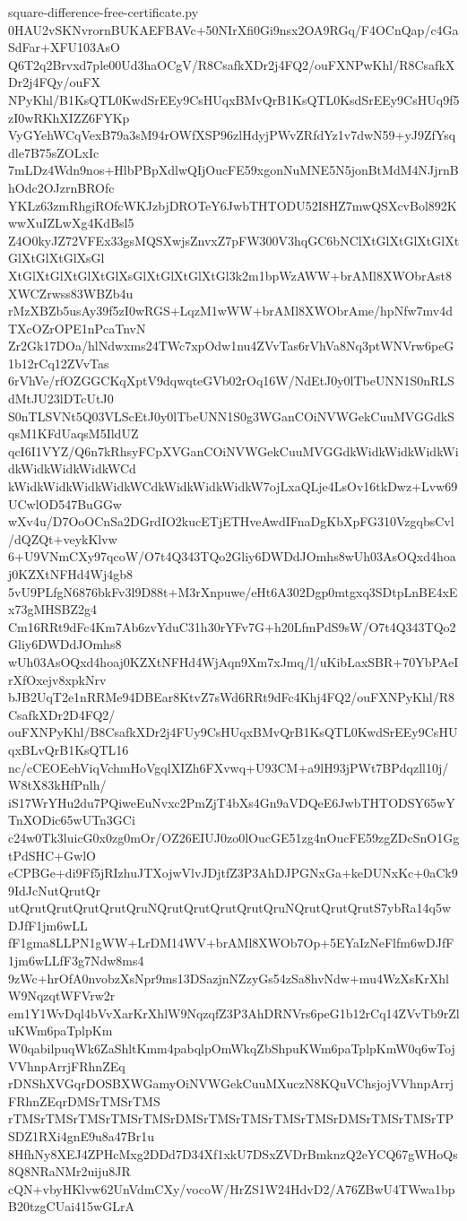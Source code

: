 \documentclass[11pt]{article}
\theoremstyle{definition}
\theoremstyle{remark}
\begin{document}
\begin{filecontents*}[overwrite]{square-difference-free-certificate.py}
0HAU2vSKNvrornBUKAEFBAVc+50NIrXfi0Gi9nsx2OA9RGq/F4OCnQap/c4GaSdFar+XFU103AsO
Q6T2q2Brvxd7ple00Ud3haOCgV/R8CsafkXDr2j4FQ2/ouFXNPwKhl/R8CsafkXDr2j4FQy/ouFX
NPyKhl/B1KsQTL0KwdSrEEy9CsHUqxBMvQrB1KsQTL0KsdSrEEy9CsHUq9f5zI0wRKhXIZZ6FYKp
VyGYehWCqVexB79a3sM94rOWfXSP96zlHdyjPWvZRfdYz1v7dwN59+yJ9ZfYsqdle7B75sZOLxIc
7mLDz4Wdn9nos+HlbPBpXdlwQIjOucFE59xgonNuMNE5N5jonBtMdM4NJjrnBhOdc2OJzrnBROfc
YKLz63zmRhgiROfcWKJzbjDROTeY6JwbTHTODU52I8HZ7mwQSXcvBol892KwwXuIZLwXg4KdBsl5
Z4O0kyJZ72VFEx33gsMQSXwjsZnvxZ7pFW300V3hqGC6bNClXtGlXtGlXtGlXtGlXtGlXtGlXsGl
XtGlXtGlXtGlXtGlXsGlXtGlXtGlXtGl3k2m1bpWzAWW+brAMl8XWObrAst8XWCZrwss83WBZb4u
rMzXBZb5usAy39f5zI0wRGS+LqzM1wWW+brAMl8XWObrAme/hpNfw7mv4dTXcOZrOPE1nPcaTnvN
Zr2Gk17DOa/hlNdwxms24TWc7xpOdw1nu4ZVvTas6rVhVa8Nq3ptWNVrw6peG1b12rCq12ZVvTas
6rVhVe/rfOZGGCKqXptV9dqwqteGVb02rOq16W/NdEtJ0y0lTbeUNN1S0nRLSdMtJU23lDTcUtJ0
S0nTLSVNt5Q03VLScEtJ0y0lTbeUNN1S0g3WGanCOiNVWGekCuuMVGGdkSqsM1KFdUaqsM5IldUZ
qcI6I1VYZ/Q6n7kRhsyFCpXVGanCOiNVWGekCuuMVGGdkWidkWidkWidkWidkWidkWidkWidkWCd
kWidkWidkWidkWidkWCdkWidkWidkWidkW7ojLxaQLje4LsOv16tkDwz+Lvw69UCwlOD547BuGGw
wXv4u/D7OoOCnSa2DGrdIO2kucETjETHveAwdIFnaDgKbXpFG310VzgqbsCvl/dQZQt+veykKlvw
6+U9VNmCXy97qcoW/O7t4Q343TQo2Gliy6DWDdJOmhs8wUh03AsOQxd4hoaj0KZXtNFHd4Wj4gb8
5vU9PLfgN6876bkFv3l9D88t+M3rXnpuwe/eHt6A302Dgp0mtgxq3SDtpLnBE4xEx73gMHSBZ2g4
Cm16RRt9dFc4Km7Ab6zvYduC31h30rYFv7G+h20LfmPdS9sW/O7t4Q343TQo2Gliy6DWDdJOmhs8
wUh03AsOQxd4hoaj0KZXtNFHd4WjAqn9Xm7xJmq/l/uKibLaxSBR+70YbPAeIrXfOxejv8xpkNrv
bJB2UqT2e1nRRMe94DBEar8KtvZ7sWd6RRt9dFc4Khj4FQ2/ouFXNPyKhl/R8CsafkXDr2D4FQ2/
ouFXNPyKhl/B8CsafkXDr2j4FUy9CsHUqxBMvQrB1KsQTL0KwdSrEEy9CsHUqxBLvQrB1KsQTL16
nc/cCEOEehViqVchmHoVgqlXIZh6FXvwq+U93CM+a9lH93jPWt7BPdqzll10j/W8tX83kHfPnlh/
iS17WrYHu2du7PQiweEuNvxc2PmZjT4bXs4Gn9aVDQeE6JwbTHTODSY65wYTnXODic65wUTn3GCi
c24w0Tk3luicG0x0zg0mOr/OZ26EIUJ0zo0lOucGE51zg4nOucFE59zgZDcSnO1GgtPdSHC+GwlO
eCPBGe+di9Ff5jRIzhuJTXojwVlvJDjtfZ3P3AhDJPGNxGa+keDUNxKc+0aCk99IdJcNutQrutQr
utQrutQrutQrutQrutQruNQrutQrutQrutQrutQruNQrutQrutQrutS7ybRa14q5wDJfF1jm6wLL
fF1gma8LLPN1gWW+LrDM14WV+brAMl8XWOb7Op+5EYaIzNeFlfm6wDJfF1jm6wLLfF3g7Ndw8ms4
9zWc+hrOfA0nvobzXsNpr9ms13DSazjnNZzyGs54zSa8hvNdw+mu4WzXsKrXhlW9NqzqtWFVrw2r
em1Y1WvDql4bVvXarKrXhlW9NqzqfZ3P3AhDRNVrs6peG1b12rCq14ZVvTb9rZluKWm6paTplpKm
W0qabilpuqWk6ZaShltKmm4pabqlpOmWkqZbShpuKWm6paTplpKmW0q6wTojVVhnpArrjFRhnZEq
rDNShXVGqrDOSBXWGamyOiNVWGekCuuMXuczN8KQuVChsjojVVhnpArrjFRhnZEqrDMSrTMSrTMS
rTMSrTMSrTMSrTMSrTMSrDMSrTMSrTMSrTMSrTMSrDMSrTMSrTMSrTPSDZ1RXi4gnE9u8a47Br1u
8HfhNy8XEJ4ZPHcMxg2DDd7D34Xf1xkU7DSxZVDrBmknzQ2eYCQ67gWHoQs8Q8NRaNMr2uiju8JR
cQN+vbyHKlvw62UnVdmCXy/vocoW/HrZS1W24HdvD2/A76ZBwU4TWwa1bpB20tzgCUai415wGLrA

\end{filecontents*}
\end{document}
